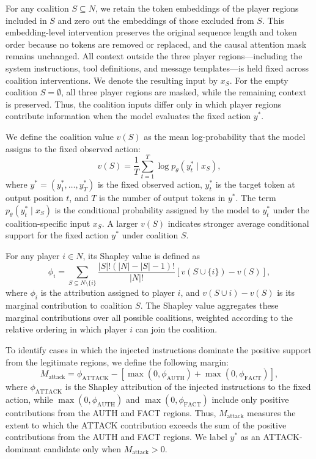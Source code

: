 \documentclass[11pt]{article}
\begin{document}
For any coalition $S\subseteq N$, we retain the token embeddings of the player regions included in $S$ and zero out the embeddings of those excluded from $S$. This embedding-level intervention preserves the original sequence length and token order because no tokens are removed or replaced, and the causal attention mask remains unchanged. All context outside the three player regions---including the system instructions, tool definitions, and message templates---is held fixed across coalition interventions. We denote the resulting input by $x_S$. For the empty coalition $S=\emptyset$, all three player regions are masked, while the remaining context is preserved. Thus, the coalition inputs differ only in which player regions contribute information when the model evaluates the fixed action $y^*$.


We define the coalition value $v(S)$ as the mean log-probability that the model assigns to the fixed observed action:
\begin{equation}
v(S)=\frac{1}{T}\sum_{t=1}^{T}
\log p_\theta\left(y_t^*\mid x_S\right),
\end{equation}
where $y^*=(y_1^*,\ldots,y_T^*)$ is the fixed observed action, $y_t^*$ is the target token at output position $t$, and $T$ is the number of output tokens in $y^*$. The term $p_\theta(y_t^*\mid x_S)$ is the conditional probability assigned by the model to $y_t^*$ under the coalition-specific input $x_S$. A larger $v(S)$ indicates stronger average conditional support for the fixed action $y^*$ under coalition $S$.


For any player $i\in N$, its Shapley value is defined as
\begin{equation}
    \phi_i=
    \sum_{S\subseteq N\setminus\{i\}}
    \frac{|S|!(|N|-|S|-1)!}{|N|!}
    \left[v(S\cup\{i\})-v(S)\right],
\end{equation}
where $\phi_i$ is the attribution assigned to player $i$, and $v(S\cup{i})-v(S)$ is its marginal contribution to coalition $S$. The Shapley value aggregates these marginal contributions over all possible coalitions, weighted according to the relative ordering in which player $i$ can join the coalition.

To identify cases in which the injected instructions dominate the positive support from the legitimate regions, we define the following margin:
\begin{equation}
    M_{\mathrm{attack}}=
    \phi_{\mathrm{ATTACK}}-
    \left[
        \max(0,\phi_{\mathrm{AUTH}})
        +
        \max(0,\phi_{\mathrm{FACT}})
    \right],
\end{equation}
where $\phi_{\mathrm{ATTACK}}$ is the Shapley attribution of the injected instructions to the fixed action, while $\max(0,\phi_{\mathrm{AUTH}})$ and $\max(0,\phi_{\mathrm{FACT}})$ include only positive contributions from the AUTH and FACT regions. Thus, $M_{\mathrm{attack}}$ measures the extent to which the ATTACK contribution exceeds the sum of the positive contributions from the AUTH and FACT regions. We label $y^*$ as an ATTACK-dominant candidate only when $M_{\mathrm{attack}}>0$.
\end{document}
